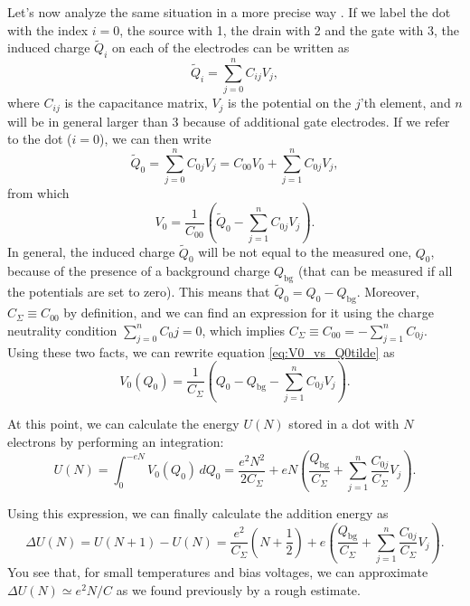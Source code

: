 \documentclass[a4paper,twoside,11pt]{book}
\begin{document}
Let's now analyze the same situation in a more precise way \citep[adapted from][]{Fasth2007}. If we label the dot with the index $i=0$, the source with 1, the drain with 2 and the gate with 3, the induced charge $\tilde{Q}_i$ on each of the electrodes can be written as
\begin{equation}
	\tilde{Q}_i = \sum_{j=0}^{n}C_{ij}V_j,
\end{equation}
where $C_{ij}$ is the capacitance matrix, $V_j$ is the potential on the $j$'th element, and $n$ will be in general larger than 3 because of additional gate electrodes. If we refer to the dot ($i=0$), we can then write
\begin{equation}
	\tilde{Q}_0 = \sum_{j=0}^{n}C_{0j}V_j = C_{00}V_0 + \sum_{j=1}^{n}C_{0j}V_j,
\end{equation}
from which
\begin{equation}
	V_0 = \frac{1}{C_{00}}\left(\tilde{Q}_0 - \sum_{j=1}^{n}C_{0j}V_j\right).
	\label{eq:V0_vs_Q0tilde}
\end{equation}
In general, the induced charge $\tilde{Q}_0$ will be not equal to the measured one, $Q_0$, because of the presence of a background charge $Q_{\text{bg}}$ (that can be measured if all the potentials are set to zero). This means that $\tilde{Q}_0 = Q_0 - Q_{\text{bg}}$. Moreover, $C_{\Sigma} \equiv C_{00}$ by definition, and we can find an expression for it using the charge neutrality condition $\sum_{j=0}^{n}C_0j=0$, which implies $C_{\Sigma} \equiv C_{00} = -\sum_{j=1}^{n}C_{0j}$. Using these two facts, we can rewrite equation \eqref{eq:V0_vs_Q0tilde} as
\begin{equation}
	V_0(Q_0) = \frac{1}{C_{\Sigma}}\left(Q_0 - Q_{\text{bg}} - \sum_{j=1}^{n}C_{0j}V_j\right).
	\label{eq:V0_vs_Q0}
\end{equation}

At this point, we can calculate the energy $U(N)$ stored in a dot with $N$ electrons by performing an integration:
\begin{equation}
	U(N) = \int_{0}^{-eN}V_0(Q_0)\,dQ_0 = \frac{e^2N^2}{2C_{\Sigma}} + eN\left( \frac{Q_{\text{bg}}}{C_{\Sigma}} + \sum_{j=1}^{n}\frac{C_{0j}}{C_{\Sigma}}V_j \right).
\end{equation}

Using this expression, we can finally calculate the addition energy as
\begin{equation}
	\Delta U (N) = U(N+1)-U(N) = \frac{e^2}{C_{\Sigma}}\left(N+\frac{1}{2}\right) + e\left( \frac{Q_{\text{bg}}}{C_{\Sigma}} + \sum_{j=1}^{n}\frac{C_{0j}}{C_{\Sigma}}V_j \right).
\end{equation}
You see that, for small temperatures and bias voltages, we can approximate $\Delta U (N) \simeq e^2N/C$ as we found previously by a rough estimate.
\end{document}

